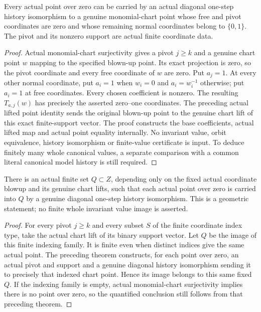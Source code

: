 \begin{theorem}
\label{hir:general-nc-actual-binary-direction-normalization}
\leanok
{}
Every actual point over zero can be carried by an actual diagonal
one-step history isomorphism to a genuine monomial-chart point whose
free and pivot coordinates are zero and whose remaining normal
coordinates belong to $\{0,1\}$. The pivot and its nonzero support are
actual finite coordinate data.
\end{theorem}
\begin{proof}
Actual monomial-chart surjectivity gives a pivot $j\geq k$ and a genuine
chart point $w$ mapping to the specified blown-up point. Its exact
projection is zero, so the pivot coordinate and every free coordinate
of $w$ are zero. Put $a_j=1$. At every other normal coordinate, put
$a_i=1$ when $w_i=0$ and $a_i=w_i^{-1}$ otherwise; put $a_i=1$ at free
coordinates. Every chosen coefficient is nonzero. The resulting
$T_{a,j}(w)$ has precisely the asserted zero--one coordinates. The
preceding actual lifted point identity sends the original blown-up
point to the genuine chart lift of this exact finite-support vector.
The proof constructs the base coefficients, actual lifted map and
actual point equality internally. No invariant value, orbit
equivalence, history isomorphism or finite-value certificate is input.
To deduce finitely many whole canonical values, a separate comparison
with a common literal canonical model history is still required.
\end{proof}

\begin{corollary}
\label{hir:general-nc-finite-geometric-fibre-orbit-representatives}
\leanok
{}
There is an actual finite set $Q\subset Z$, depending only on the fixed
actual coordinate blowup and its genuine chart lifts, such that each
actual point over zero is carried into $Q$ by a genuine diagonal
one-step history isomorphism. This is a geometric statement; no finite
whole invariant value image is asserted.
\end{corollary}
\begin{proof}
For every pivot $j\geq k$ and every subset $S$ of the finite coordinate
index type, take the actual chart lift of its binary support vector.
Let $Q$ be the image of this finite indexing family. It is finite even
when distinct indices give the same actual point. The preceding theorem
constructs, for each point over zero, an actual pivot and support and
a genuine diagonal history isomorphism sending it to precisely that
indexed chart point. Hence its image belongs to this same fixed $Q$.
If the indexing family is empty, actual monomial-chart surjectivity
implies there is no point over zero, so the quantified conclusion
still follows from that preceding theorem.
\end{proof}
